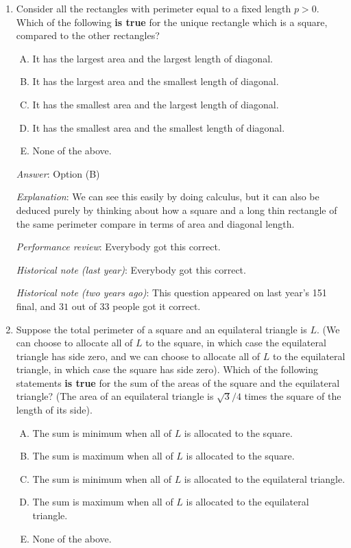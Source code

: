 \documentclass[10pt]{amsart}
\begin{document}
\begin{enumerate}

\item Consider all the rectangles with perimeter equal to a fixed
  length $p > 0$. Which of the following {\bf is true} for the unique
  rectangle which is a square, compared to the other rectangles?

  \begin{enumerate}[(A)]
  \item It has the largest area and the largest length of diagonal.
  \item It has the largest area and the smallest length of diagonal.
  \item It has the smallest area and the largest length of diagonal.
  \item It has the smallest area and the smallest length of diagonal.
  \item None of the above.
  \end{enumerate}

  {\em Answer}: Option (B)

  {\em Explanation}: We can see this easily by doing calculus, but it
  can also be deduced purely by thinking about how a square and a long
  thin rectangle of the same perimeter compare in terms of area and
  diagonal length.

  {\em Performance review}: Everybody got this correct.

  {\em Historical note (last year)}: Everybody got this correct.

  {\em Historical note (two years ago)}: This question appeared on
  last year's 151 final, and $31$ out of $33$ people got it correct.

\item Suppose the total perimeter of a square and an equilateral
  triangle is $L$. (We can choose to allocate all of $L$ to the
  square, in which case the equilateral triangle has side zero, and we
  can choose to allocate all of $L$ to the equilateral triangle, in
  which case the square has side zero). Which of the following
  statements {\bf is true} for the sum of the areas of the square and
  the equilateral triangle? (The area of an equilateral triangle is
  $\sqrt{3}/4$ times the square of the length of its side).
  \begin{enumerate}[(A)]
  \item The sum is minimum when all of $L$ is allocated to the square.
  \item The sum is maximum when all of $L$ is allocated to the square.
  \item The sum is minimum when all of $L$ is allocated to the
    equilateral triangle.
  \item The sum is maximum when all of $L$ is allocated to the
    equilateral triangle.
  \item None of the above.
  \end{enumerate}


\end{enumerate}
\end{document}
